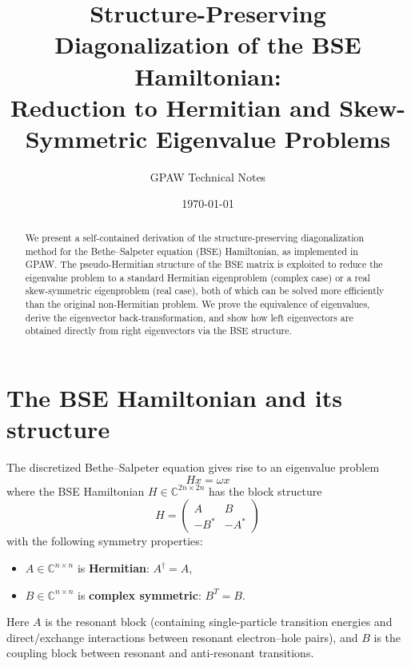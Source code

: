 \documentclass[11pt]{article}
\title{Structure-Preserving Diagonalization of the BSE Hamiltonian:\\
  Reduction to Hermitian and Skew-Symmetric Eigenvalue Problems}
\author{GPAW Technical Notes}
\date{\today}
\newcommand{\bmat}[1]{\begin{pmatrix}#1\end{pmatrix}}
\newcommand{\hc}{\dagger}
\newcommand{\complexes}{\mathbb{C}}
\begin{document}
\maketitle

\begin{abstract}
  We present a self-contained derivation of the structure-preserving
  diagonalization method for the Bethe--Salpeter equation (BSE)
  Hamiltonian, as implemented in GPAW.  The pseudo-Hermitian structure
  of the BSE matrix is exploited to reduce the eigenvalue problem to a
  standard Hermitian eigenproblem (complex case) or a real
  skew-symmetric eigenproblem (real case), both of which can be solved
  more efficiently than the original non-Hermitian problem.  We prove
  the equivalence of eigenvalues, derive the eigenvector
  back-transformation, and show how left eigenvectors are obtained
  directly from right eigenvectors via the BSE structure.
\end{abstract}

\tableofcontents

\section{The BSE Hamiltonian and its structure}

The discretized Bethe--Salpeter equation gives rise to an eigenvalue
problem
\begin{equation}\label{eq:bse}
  H x = \omega x
\end{equation}
where the BSE Hamiltonian $H \in \complexes^{2n \times 2n}$ has the
block structure
\begin{equation}\label{eq:H}
  H = \bmat{A & B \\ -B^* & -A^*}
\end{equation}
with the following symmetry properties:
\begin{itemize}
  \item $A \in \complexes^{n\times n}$ is \textbf{Hermitian}: $A^\hc = A$,
  \item $B \in \complexes^{n\times n}$ is \textbf{complex symmetric}: $B^T = B$.
\end{itemize}
Here $A$ is the resonant block (containing single-particle transition
energies and direct/exchange interactions between resonant
electron--hole pairs), and $B$ is the coupling block between resonant
and anti-resonant transitions.
\end{document}
